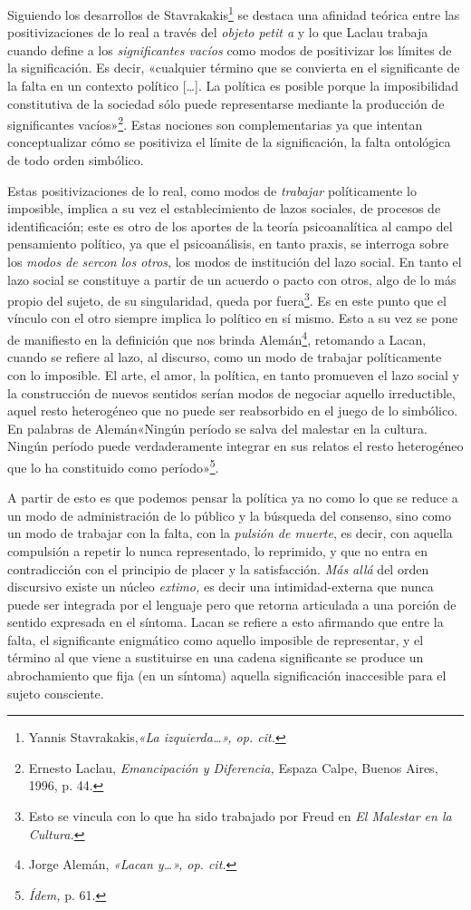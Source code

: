 Siguiendo los desarrollos de Stavrakakis\footnote{Yannis Stavrakakis,\emph{«La izquierda\ldots», op. cit.}} se destaca una afinidad teórica entre las positivizaciones de lo real a través del \emph{objeto petit a} y lo que Laclau trabaja cuando define a los \emph{significantes vacíos} como modos de positivizar los límites de la significación. Es decir, «cualquier término que se convierta en el significante de la falta en un contexto político {[}\ldots{]}. La política es posible porque la imposibilidad constitutiva de la sociedad sólo puede representarse mediante la producción de significantes vacíos»\footnote{Ernesto Laclau, \emph{Emancipación y Diferencia,} Espaza Calpe, Buenos Aires, 1996, p. 44.}. Estas nociones son complementarias ya que intentan conceptualizar cómo se positiviza el límite de la significación, la falta ontológica de todo orden simbólico.

Estas positivizaciones de lo real, como modos de \emph{trabajar} políticamente lo imposible, implica a su vez el establecimiento de lazos sociales, de procesos de identificación; este es otro de los aportes de la teoría psicoanalítica al campo del pensamiento político, ya que el psicoanálisis, en tanto praxis, se interroga sobre los \emph{modos de sercon los otros}, los modos de institución del lazo social. En tanto el lazo social se constituye a partir de un acuerdo o pacto con otros, algo de lo más propio del sujeto, de su singularidad, queda por fuera\footnote{Esto se vincula con lo que ha sido trabajado por Freud en \emph{El Malestar en la Cultura.}}. Es en este punto que el vínculo con el otro siempre implica lo político en sí mismo. Esto a su vez se pone de manifiesto en la definición que nos brinda Alemán\footnote{Jorge Alemán, \emph{«Lacan y\ldots», op. cit.}}, retomando a Lacan, cuando se refiere al lazo, al discurso, como un modo de trabajar políticamente con lo imposible. El arte, el amor, la política, en tanto promueven el lazo social y la construcción de nuevos sentidos serían modos de negociar aquello irreductible, aquel resto heterogéneo que no puede ser reabsorbido en el juego de lo simbólico. En palabras de Alemán«Ningún período se salva del malestar en la cultura. Ningún período puede verdaderamente integrar en sus relatos el resto heterogéneo que lo ha constituido como período»\footnote{\emph{Ídem,} p. 61.}.

A partir de esto es que podemos pensar la política ya no como lo que se reduce a un modo de administración de lo público y la búsqueda del consenso, sino como un modo de trabajar con la falta, con la \emph{pulsión de muerte}, es decir, con aquella compulsión a repetir lo nunca representado, lo reprimido, y que no entra en contradicción con el principio de placer y la satisfacción. \emph{Más allá} del orden discursivo existe un núcleo \emph{extimo,} es decir una intimidad-externa que nunca puede ser integrada por el lenguaje pero que retorna articulada a una porción de sentido expresada en el síntoma. Lacan se refiere a esto afirmando que entre la falta, el significante enigmático como aquello imposible de representar, y el término al que viene a sustituirse en una cadena significante se produce un abrochamiento que fija (en un síntoma) aquella significación inaccesible para el sujeto consciente.

